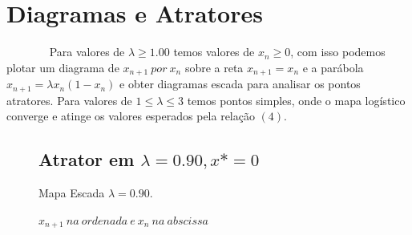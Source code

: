 \documentclass[pdftex,12pt,a4paper]{article}
\begin{document}
\section{Diagramas e Atratores}
~~~~~~~ Para valores de $ \lambda \geq 1.00$ temos valores de $ x_{n} \geq 0$, com isso podemos plotar um diagrama de $x_{n+1}\ por\ x_{n}$ sobre a reta $x_{n+1} = x_{n}$ e a parábola $x_{n+1} = \lambda x_n(1-x_n)$ e obter diagramas escada para analisar os pontos atratores. Para valores de $1 \leq \lambda \leq 3$ temos pontos simples, onde o mapa logístico converge e atinge os valores esperados pela relação $(4)$.
\pagebreak
\newpage

\begin{figure}
\subsection{Atrator em $\lambda = 0.90, x* = 0$}
\centering
\caption{Mapa Escada $\lambda = 0.90$.}
\caption*{$x_{n+1}\ na\ ordenada\ e\ x_{n}\ na\ abscissa$ }
\end{figure}
\pagebreak
\newpage
\end{document}
